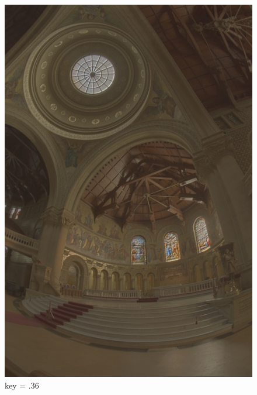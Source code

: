 \documentclass{article}
\begin{document}
    \begin{figure}[!htb]
      \includegraphics[scale=.27]{./data/3/avar/3_6.jpg}
      \caption{key = .36}
    \endminipage\hfill

\end{figure}
\end{document}
